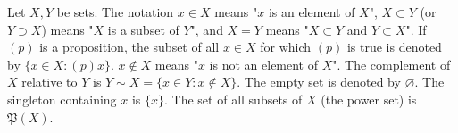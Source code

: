 Let $X, Y$ be sets. The notation $x \in X$ means "$x$ is an element of $X$", $X \subset Y$ (or $Y \supset X$) means "$X$ is a subset of $Y$", and $X = Y$ means "$X \subset Y$ and $Y \subset X$". If $(p)$ is a proposition, the subset of all $x \in X$ for which $(p)$ is true is denoted by $\{x \in X: (p)x\}$. $x \notin X$ means "$x$ is not an element of $X$". The complement of $X$ relative to $Y$ is $Y \sim X = \{x \in Y: x \notin X\}$. The empty set is denoted by $\varnothing$. The singleton containing $x$ is $\{x\}$. The set of all subsets of $X$ (the power set) is $\mathfrak{P}(X)$.
